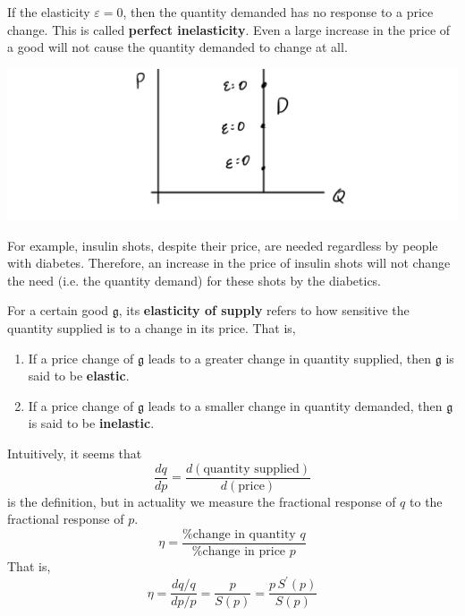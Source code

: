 \documentclass{article}
\begin{document}
      \begin{definition}
        If the elasticity $\varepsilon = 0$, then the quantity demanded has no response to a price change. This is called \textbf{perfect inelasticity}. Even a large increase in the price of a good will not cause the quantity demanded to change at all. 
        \begin{center}
          \includegraphics[scale=0.25]{img/Perfectly_Inelastic.PNG}
        \end{center}
        For example, insulin shots, despite their price, are needed regardless by people with diabetes. Therefore, an increase in the price of insulin shots will not change the need (i.e. the quantity demand) for these shots by the diabetics. 
      \end{definition}

      \begin{definition}
        For a certain good $\mathfrak{g}$, its \textbf{elasticity of supply} refers to how sensitive the quantity supplied is to a change in its price. That is, 
        \begin{enumerate}
          \item If a price change of $\mathfrak{g}$ leads to a greater change in quantity supplied, then $\mathfrak{g}$ is said to be \textbf{elastic}. 
          \item If a price change of $\mathfrak{g}$ leads to a smaller change in quantity demanded, then $\mathfrak{g}$ is said to be \textbf{inelastic}. 
        \end{enumerate}
        Intuitively, it seems that 
        \[\frac{d q}{d p} = \frac{d (\text{quantity supplied})}{d (\text{price})}\]
        is the definition, but in actuality we measure the fractional response of $q$ to the fractional response of $p$. 
        \[\eta = \frac{\text{\% change in quantity } q}{\text{\% change in price } p}\]
        That is, 
        \[\eta = \frac{dq/q}{dp/p} = \frac{p}{S(p)} = \frac{p \, S^\prime (p)}{S(p)}\]
      \end{definition}
\end{document}

